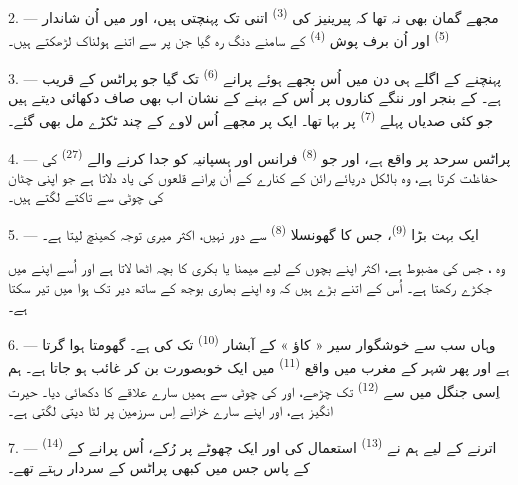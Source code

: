 2. --- مجھے گمان بھی نہ تھا کہ پیرینیز کی 
\textsuperscript{(3)} اتنی  تک پہنچتی ہیں، اور میں اُن
شاندار  \textsuperscript{(5)} اور اُن برف پوش
 \textsuperscript{(4)} کے سامنے دنگ رہ گیا جن پر
سے اتنے ہولناک  لڑھکتے ہیں۔

\VUsaut{3.0mm}
\VUsaut{3.0mm}

3. --- پہنچنے کے اگلے ہی دن میں اُس بجھے ہوئے پرانے
 \textsuperscript{(6)} تک گیا جو پراٹس کے قریب ہے۔
 کے بنجر اور ننگے کناروں پر اُس  کے بہنے
کے نشان اب بھی صاف دکھائی دیتے ہیں جو کئی صدیاں پہلے  \textsuperscript{(7)} پر بہا تھا۔ ایک  پر مجھے اُس
لاوے کے چند ٹکڑے مل بھی گئے۔

4. --- پراٹس سرحد پر واقع ہے، اور جو  \textsuperscript{(8)}
فرانس اور ہسپانیہ کو جدا کرنے والے  \textsuperscript{(27)}
کی حفاظت کرتا ہے، وہ بالکل دریائے رائن کے کنارے کے اُن پرانے قلعوں کی
یاد دلاتا ہے جو اپنی چٹان کی چوٹی سے  تاکتے لگتے ہیں۔

5. --- ایک بہت بڑا  \textsuperscript{(9)}، جس کا گھونسلا
 \textsuperscript{(8)} سے دور نہیں، اکثر میری توجہ کھینچ
لیتا ہے۔

وہ ، جس کی  مضبوط ہے، اکثر اپنے
بچوں کے لیے میمنا یا بکری کا بچہ اٹھا لاتا ہے اور اُسے اپنے
 میں جکڑے رکھتا ہے۔ اُس کے  اتنے بڑے ہیں کہ
وہ اپنے بھاری بوجھ کے ساتھ دیر تک ہوا میں تیر سکتا ہے۔

\VUsaut{3.0mm}
\VUsaut{3.0mm}

6. --- وہاں سب سے خوشگوار سیر « کاؤ » کے آبشار \textsuperscript{(10)}
تک کی ہے۔  گھومتا ہوا گرتا ہے اور پھر شہر کے
مغرب میں واقع  \textsuperscript{(11)} میں ایک
خوبصورت  بن کر غائب ہو جاتا ہے۔ ہم اِسی جنگل میں سے
 \textsuperscript{(12)} تک چڑھے، اور
 کی چوٹی سے ہمیں سارے علاقے کا 
دکھائی دیا۔  حیرت انگیز ہے، اور  اپنے سارے
خزانے اِس سرزمین پر لٹا دیتی لگتی ہے۔

7. --- اترنے کے لیے ہم نے  \textsuperscript{(13)}
استعمال کی اور ایک چھوٹے  پر رُکے، اُس پرانے
 کے  \textsuperscript{(14)} کے
پاس جس میں کبھی پراٹس کے سردار رہتے تھے۔

